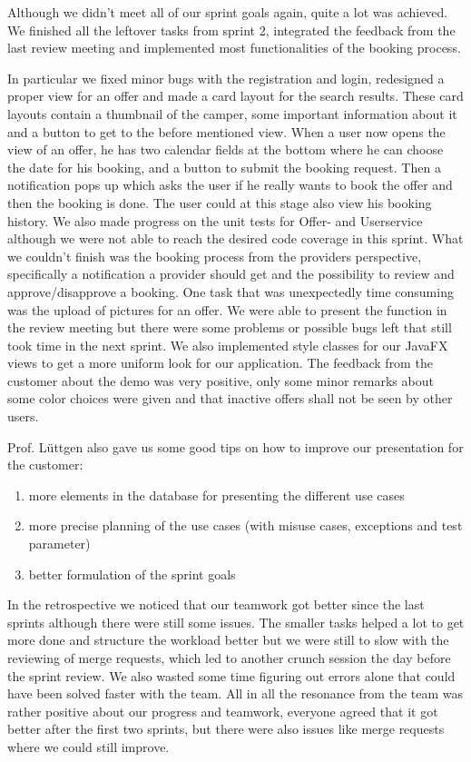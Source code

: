 Although we didn't meet all of our sprint goals again, quite a lot was achieved.
We finished all the leftover tasks from sprint 2, integrated the feedback from the last review meeting and implemented most functionalities of the booking process.

In particular we fixed minor bugs with the registration and login, redesigned a proper view for an offer and made a card layout for the search results.
These card layouts contain a thumbnail of the camper, some important information about it and a button to get to the before mentioned view.
When a user now opens the view of an offer, he has two calendar fields at the bottom where he can choose the date for his booking,
and a button to submit the booking request. Then a notification pops up which asks the user if he really wants to book the offer
and then the booking is done. The user could at this stage also view his booking history.
We also made progress on the unit tests for Offer- and Userservice although we were not able to reach the desired code coverage in this sprint.
What we couldn't finish was the booking process from the providers perspective, specifically a notification a provider should get and the possibility to review and approve/disapprove a booking.
One task that was unexpectedly time consuming was the upload of pictures for an offer. We were able to present the function
in the review meeting but there were some problems or possible bugs left that still took time in the next sprint.
We also implemented style classes for our JavaFX views to get a more uniform look for our application.
The feedback from the customer about the demo was very positive, only some minor remarks about some color choices were given and that inactive offers shall not be seen by other users.

Prof. Lüttgen also gave us some good tips on how to improve our presentation for the customer:
\begin{enumerate}
    \item more elements in the database for presenting the different use cases
    \item more precise planning of the use cases (with misuse cases, exceptions and test parameter)
    \item better formulation of the sprint goals
\end{enumerate}

In the retrospective we noticed that our teamwork got better since the last sprints although there were still some issues.
The smaller tasks helped a lot to get more done and structure the workload better but we were still to slow with the reviewing of merge requests, which led to another crunch session the day before the sprint review.
We also wasted some time figuring out errors alone that could have been solved faster with the team.
All in all the resonance from the team was rather positive about our progress and teamwork, everyone agreed that it got better after the first two sprints, but there were also issues like merge requests where we could still improve.

